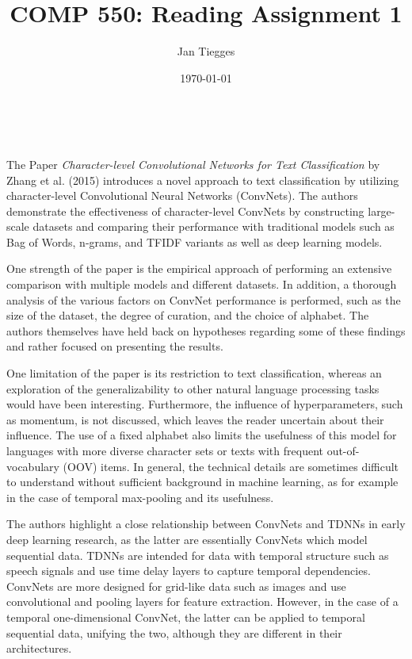 \documentclass[12pt]{article}
\title{\textbf{COMP 550: Reading Assignment 1}}
\author{Jan Tiegges}
\date{\today}
\makeatletter
\renewcommand{\maketitle}{%
  \begin{center}
    {\large\bfseries\MakeUppercase\@title}\\[1ex]
    \MakeUppercase{\@author \hspace{2em} \@date}
  \end{center}
}
\makeatother
\begin{document}
\maketitle

The Paper \textit{Character-level Convolutional Networks for Text Classification} by Zhang et al. (2015) introduces a novel approach to text classification by utilizing character-level Convolutional Neural Networks (ConvNets). The authors demonstrate the effectiveness of character-level ConvNets by constructing large-scale datasets and comparing their performance with traditional models such as Bag of Words, n-grams, and TFIDF variants as well as deep learning models.

One strength of the paper is the empirical approach of performing an extensive comparison with multiple models and different datasets. In addition, a thorough analysis of the various factors on ConvNet performance is performed, such as the size of the dataset, the degree of curation, and the choice of alphabet. The authors themselves have held back on hypotheses regarding some of these findings and rather focused on presenting the results.

One limitation of the paper is its restriction to text classification, whereas an exploration of the generalizability to other natural language processing tasks would have been interesting. Furthermore, the influence of hyperparameters, such as momentum, is not discussed, which leaves the reader uncertain about their influence. The use of a fixed alphabet also limits the usefulness of this model for languages with more diverse character sets or texts with frequent out-of-vocabulary (OOV) items. In general, the technical details are sometimes difficult to understand without sufficient background in machine learning, as for example in the case of temporal max-pooling and its usefulness.

The authors highlight a close relationship between ConvNets and TDNNs in early deep learning research, as the latter are essentially ConvNets which model sequential data. TDNNs are intended for data with temporal structure such as speech signals and use time delay layers to capture temporal dependencies. ConvNets are more designed for grid-like data such as images and use convolutional and pooling layers for feature extraction. However, in the case of a temporal one-dimensional ConvNet, the latter can be applied to temporal sequential data, unifying the two, although they are different in their architectures.
\end{document}
